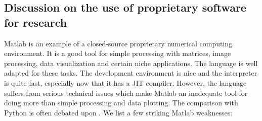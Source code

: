 \subsection{Discussion on the use of proprietary software for research}

Matlab is an example of a closed-source proprietary numerical computing
environment.
%
It is a good tool for simple processing with matrices, image processing, data
visualization and certain niche applications. The language is well adapted for
these tasks. The development environment is nice and the interpreter is quite
fast, especially now that it has a JIT compiler.
%
However, the language suffers from serious technical issues which make Matlab
an inadequate tool
for doing more than simple processing and data plotting. The comparison with
Python is often debated upon . We list a few striking Matlab weaknesses:


